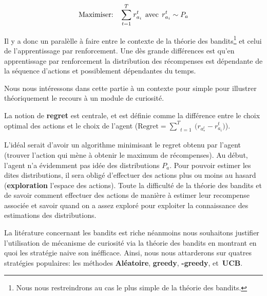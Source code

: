 $$
    \text{Maximiser: \: } \underset{t=1}{\overset{T}{\sum}}\:r^t_{a_i} \:\: \text{avec} \:\: r^t_{a_i}\sim P_a
$$

Il y a donc un paralèlle à faire entre le contexte de la théorie des bandits\footnote{Nous nous restreindrons au cas le plus simple de la théorie des bandits.} et celui de l'apprentissage par renforcement. Une dès grande différences est qu'en apprentissage par renforcement la distribution des récompenses est dépendante de la séquence d'actions et possiblement dépendantes du temps. 

Nous nous intéressons dans cette partie à un contexte pour simple pour illustrer théoriquement le recours à un module de curiosité.

La notion de \textbf{regret} est centrale, et est définie comme la différence entre le choix optimal des actions et le choix de l'agent ($\text{Regret} = \underset{t=1}{\overset{T}{\sum}}\: \big( r_a_*^t - r^t_{a_i} \big) $).

L'idéal serait d'avoir un algorithme minimisant le regret obtenu par l'agent (trouver l'action qui mène à obtenir le maximum de récompenses). Au début, l'agent n'a évidemment pas idée des distributions $P_a$. Pour pouvoir estimer les dites distributions, il sera obligé d'effectuer des actions plus ou moins au hasard (\textbf{exploration} l'espace des actions). Toute la difficulté de la théorie des bandits et de savoir comment effectuer des actions de manière à estimer leur recompense associée et savoir quand on a assez exploré pour exploiter la connaissance des estimations des distributions. 

La litérature concernant les bandits est riche néanmoins nous souhaitons justifier l'utilisation de mécanisme de curiosité via la théorie des bandits en montrant en quoi les stratégie naive son inéfficace. Ainsi, nous nous attarderons sur quatres stratégies populaires: les méthodes \textbf{Aléatoire}, \textbf{greedy}, \bm{\epsilon}\textbf{-greedy}, et\ \textbf{UCB}.

